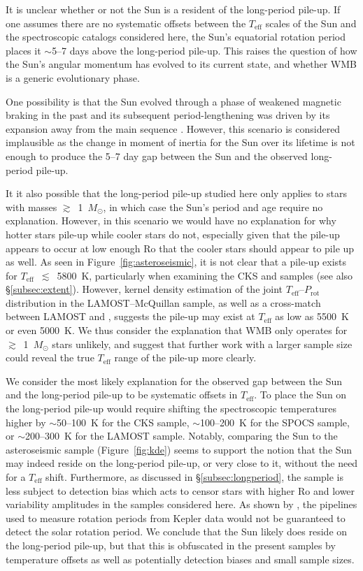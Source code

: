 \documentclass[linenumbers,tighten,trackchanges,twocolumn]{aastex631}
\newcommand{\lamostmcq}{LAMOST--McQuillan\xspace}
\newcommand{\teff}{\ensuremath{T_{\mathrm{eff}}}\xspace}
\newcommand{\msun}{$M_\odot$\xspace}
\newcommand{\prot}{\ensuremath{P_\mathrm{rot}}\xspace}
\begin{document}
{\color{red} 

It is unclear whether or not the Sun is a resident of the long-period pile-up. If one assumes there are no systematic offsets between the \teff scales of the Sun and the spectroscopic catalogs considered here, the Sun's equatorial rotation period places it $\sim$5--7 days above the long-period pile-up. This raises the question of how the Sun's angular momentum has evolved to its current state, and whether WMB is a generic evolutionary phase. 

One possibility is that the Sun evolved through a phase of weakened magnetic braking in the past and its subsequent period-lengthening was driven by its expansion away from the main sequence \citep[e.g.][]{vanSaders2019}. However, this scenario is considered implausible as the change in moment of inertia for the Sun over its lifetime is not enough to produce the 5--7 day gap between the Sun and the observed long-period pile-up. 

It it also possible that the long-period pile-up studied here only applies to stars with masses $\gtrsim$~1~\msun, in which case the Sun's period and age require no explanation. However, in this scenario we would have no explanation for why hotter stars pile-up while cooler stars do not, especially given that the pile-up appears to occur at low enough Ro that the cooler stars should appear to pile up as well. As seen in Figure~\ref{fig:asteroseismic}, it is not clear that a pile-up exists for \teff~$\lesssim$~5800~K, particularly when examining the CKS and \citet{Hall2021} samples (see also \S\ref{subsec:extent}). However, kernel density estimation of the joint \teff--\prot distribution in the \lamostmcq sample, as well as a cross-match between LAMOST and \citet{Santos2021}, suggests the pile-up may exist at \teff as low as 5500~K or even 5000~K. We thus consider the explanation that WMB only operates for $\gtrsim$~1~\msun stars unlikely, and suggest that further work with a larger sample size could reveal the true \teff range of the pile-up more clearly. 

We consider the most likely explanation for the observed gap between the Sun and the long-period pile-up to be systematic offsets in \teff. To place the Sun on the long-period pile-up would require shifting the spectroscopic temperatures higher by $\sim$50--100~K for the CKS sample, $\sim$100--200~K for the SPOCS sample, or $\sim$200--300~K for the LAMOST sample. Notably, comparing the Sun to the \citet{Hall2021} asteroseismic sample (Figure~\ref{fig:kde}) seems to support the notion that the Sun may indeed reside on the long-period pile-up, or very close to it, without the need for a \teff shift. Furthermore, as discussed in \S\ref{subsec:longperiod}, the \citet{Hall2021} sample is less subject to detection bias which acts to censor stars with higher Ro and lower variability amplitudes in the samples considered here. As shown by \citet{Aigrain2015}, the pipelines used to measure rotation periods from Kepler data would not be guaranteed to detect the solar rotation period. We conclude that the Sun likely does reside on the long-period pile-up, but that this is obfuscated in the present samples by temperature offsets as well as potentially detection biases and small sample sizes.
}
\end{document}
